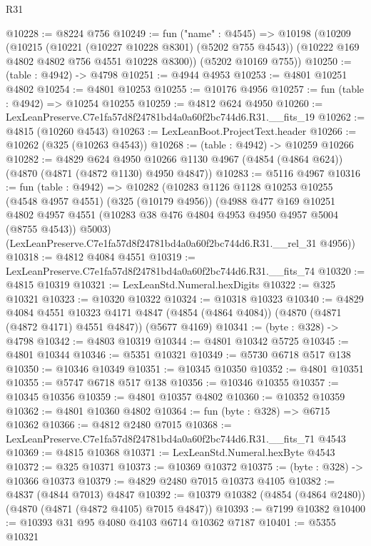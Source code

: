 \begin{lexlean}{R31}
\begin{coremodule}
@10228 := @8224 @756
@10249 := fun ("name" : @4545) =>
  @10198
    (@10209
      (@10215
        (@10221 (@10227 @10228 @8301) (@5202 @755 @4543))
        (@10222 @169 @4802 @4802 @756 @4551 @10228 @8300))
      (@5202 @10169 @755))
@10250 := (table : @4942) -> @4798
@10251 := @4944 @4953
@10253 := @4801 @10251 @4802
@10254 := @4801 @10253
@10255 := @10176 @4956
@10257 := fun (table : @4942) => @10254 @10255
@10259 := @4812 @624 @4950
@10260 := LexLeanPreserve.C7e1fa57d8f24781bd4a0a60f2bc744d6.R31.__fits_19
@10262 := @4815 (@10260 @4543)
@10263 := LexLeanBoot.ProjectText.header
@10266 := @10262 (@325 (@10263 @4543))
@10268 := (table : @4942) -> @10259 @10266
@10282 := @4829
    @624
    @4950
    @10266
    @1130
    @4967
    (@4854 (@4864 @624))
    (@4870 (@4871 (@4872 @1130) @4950 @4847))
@10283 := @5116 @4967
@10316 := fun (table : @4942) =>
  @10282
    (@10283
      @1126
      @1128
      @10253
      @10255
      (@4548 @4957 @4551)
      (@325 (@10179 @4956))
      (@4988
        @477
        @169
        @10251
        @4802
        @4957
        @4551
        (@10283 @38 @476 @4804 @4953 @4950 @4957 @5004 (@8755 @4543))
        @5003)
      (LexLeanPreserve.C7e1fa57d8f24781bd4a0a60f2bc744d6.R31.__rel_31 @4956))
@10318 := @4812 @4084 @4551
@10319 := LexLeanPreserve.C7e1fa57d8f24781bd4a0a60f2bc744d6.R31.__fits_74
@10320 := @4815 @10319
@10321 := LexLeanStd.Numeral.hexDigits
@10322 := @325 @10321
@10323 := @10320 @10322
@10324 := @10318 @10323
@10340 := @4829
    @4084
    @4551
    @10323
    @4171
    @4847
    (@4854 (@4864 @4084))
    (@4870 (@4871 (@4872 @4171) @4551 @4847))
    (@5677 @4169)
@10341 := (byte : @328) -> @4798
@10342 := @4803 @10319
@10344 := @4801 @10342 @5725
@10345 := @4801 @10344
@10346 := @5351 @10321
@10349 := @5730 @6718 @517 @138
@10350 := @10346 @10349
@10351 := @10345 @10350
@10352 := @4801 @10351
@10355 := @5747 @6718 @517 @138
@10356 := @10346 @10355
@10357 := @10345 @10356
@10359 := @4801 @10357 @4802
@10360 := @10352 @10359
@10362 := @4801 @10360 @4802
@10364 := fun (byte : @328) => @6715 @10362
@10366 := @4812 @2480 @7015
@10368 := LexLeanPreserve.C7e1fa57d8f24781bd4a0a60f2bc744d6.R31.__fits_71 @4543
@10369 := @4815 @10368
@10371 := LexLeanStd.Numeral.hexByte @4543
@10372 := @325 @10371
@10373 := @10369 @10372
@10375 := (byte : @328) -> @10366 @10373
@10379 := @4829 @2480 @7015 @10373 @4105
@10382 := @4837 (@4844 @7013) @4847
@10392 := @10379 @10382 (@4854 (@4864 @2480)) (@4870 (@4871 (@4872 @4105) @7015 @4847))
@10393 := @7199 @10382
@10400 := @10393 @31 @95 @4080 @4103 @6714 @10362 @7187
@10401 := @5355 @10321

\end{coremodule}
\end{lexlean}
